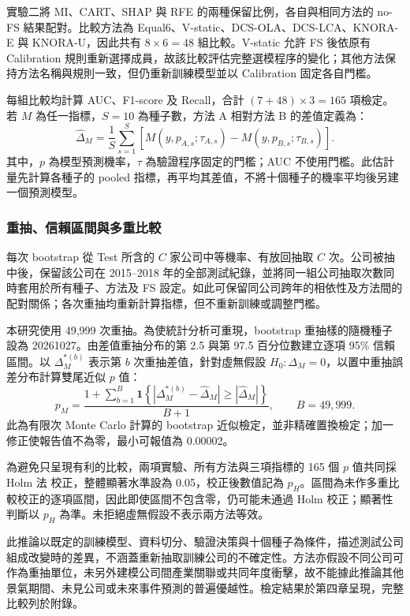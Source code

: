 實驗二將 MI、CART、SHAP 與 RFE 的兩種保留比例，各自與相同方法的 no-FS 結果配對。比較方法為 Equal6、V-static、DCS-OLA、DCS-LCA、KNORA-E 與 KNORA-U，因此共有 \(8\times6=48\) 組比較。V-static 允許 FS 後依原有 Calibration 規則重新選擇成員，故該比較評估完整選模程序的變化；其他方法保持方法名稱與規則一致，但仍重新訓練模型並以 Calibration 固定各自門檻。

每組比較均計算 AUC、F1-score 及 Recall，合計 \((7+48)\times3=165\) 項檢定。若 \(M\) 為任一指標，\(S=10\) 為種子數，方法 A 相對方法 B 的差值定義為：
\begin{equation}\label{eq:stats-difference}
\widehat{\Delta}_M=\frac{1}{S}\sum_{s=1}^{S}
\left[M(y,p_{A,s};\tau_{A,s})-M(y,p_{B,s};\tau_{B,s})\right].
\end{equation}
其中，\(p\) 為模型預測機率，\(\tau\) 為驗證程序固定的門檻；AUC 不使用門檻。此估計量先計算各種子的 pooled 指標，再平均其差值，不將十個種子的機率平均後另建一個預測模型。

\subsubsection{重抽、信賴區間與多重比較}

每次 bootstrap 從 Test 所含的 \(C\) 家公司中等機率、有放回抽取 \(C\) 次。公司被抽中後，保留該公司在 2015--2018 年的全部測試紀錄，並將同一組公司抽取次數同時套用於所有種子、方法及 FS 設定。如此可保留同公司跨年的相依性及方法間的配對關係；各次重抽均重新計算指標，但不重新訓練或調整門檻。

本研究使用 49,999 次重抽。為使統計分析可重現，bootstrap 重抽樣的隨機種子設為 20261027。由差值重抽分布的第 2.5 與第 97.5 百分位數建立逐項 95\% 信賴區間。以 \(\Delta_M^{*(b)}\) 表示第 \(b\) 次重抽差值，針對虛無假設 \(H_0:\Delta_M=0\)，以置中重抽誤差分布計算雙尾近似 \(p\) 值：
\begin{equation}\label{eq:stats-bootstrap-p}
p_M=\frac{1+\sum_{b=1}^{B}\mathbf{1}\!\left\{
\left|\Delta_M^{*(b)}-\widehat{\Delta}_M\right|\geq
\left|\widehat{\Delta}_M\right|\right\}}{B+1},
\qquad B=49{,}999.
\end{equation}
此為有限次 Monte Carlo 計算的 bootstrap 近似檢定，並非精確置換檢定；加一修正使報告值不為零，最小可報值為 0.00002。

為避免只呈現有利的比較，兩項實驗、所有方法與三項指標的 165 個 \(p\) 值共同採 Holm 法\autocite{holm1979multiple} 校正，整體顯著水準設為 0.05，校正後數值記為 \(p_H\)。區間為未作多重比較校正的逐項區間，因此即使區間不包含零，仍可能未通過 Holm 校正；顯著性判斷以 \(p_H\) 為準。未拒絕虛無假設不表示兩方法等效。

此推論以既定的訓練模型、資料切分、驗證決策與十個種子為條件，描述測試公司組成改變時的差異，不涵蓋重新抽取訓練公司的不確定性。方法亦假設不同公司可作為重抽單位，未另外建模公司間產業關聯或共同年度衝擊，故不能據此推論其他景氣期間、未見公司或未來事件預測的普遍優越性。檢定結果於第四章呈現，完整比較列於附錄。
\endgroup
